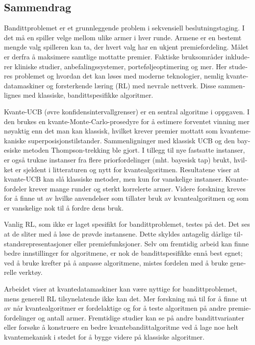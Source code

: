 \begin{otherlanguage}{norsk}

  \chapter{Sammendrag}
  Bandittproblemet er et grunnleggende problem i sekvensiell beslutningstaging.
  I det må en spiller velge mellom ulike armer i hver runde.
  Armene er en bestemt mengde valg spilleren kan ta, der hvert valg har en ukjent premiefordeling.
  Målet er derfra å maksimere samtlige mottatte premier.
  Faktiske bruksområder inkluderer kliniske studier, anbefalingssystemer, porteføljeoptimering og mer.
  Her studeres problemet og hvordan det kan løses med moderne teknologier, nemlig kvantedatamaskiner og forsterkende læring (RL) med nevrale nettverk.
  Disse sammenlignes med klassiske, bandittspesifikke algoritmer.

  Kvante-UCB (øvre konfidensintervallgrenser) er en sentral algoritme i oppgaven.
  I den brukes en kvante-Monte-Carlo-prosedyre for å estimere forventet vinning mer nøyaktig enn det man kan klassisk, hvilket krever premier mottatt som kvantemekaniske superposisjonstilstander.
  Sammenligninger med klassisk UCB og den bayesiske metoden Thompson-trekking ble gjort.
  I tillegg til nye fastsatte instanser, er også trukne instanser fra flere priorfordelinger (mht. bayesisk tap) brukt, hvilket er sjeldent i litteraturen og nytt for kvantealgoritmen.
  Resultatene viser at kvante-UCB kan slå klassiske metoder, men kun for vanskelige instanser.
  Kvantefordeler krever mange runder og sterkt korrelerte armer.
  Videre forskning kreves for å finne ut av hvilke anvendelser som tillater bruk av kvantealgoritmen og som er vanskelige nok til å fordre dens bruk.

  Vanlig RL, som ikke er laget spesifikt for bandittproblemet, testes på det.
  Det ses at de sliter med å løse de prøvde instansene.
  Dette skyldes antagelig dårlige tilstandsrepresentasjoner eller premiefunksjoner.
  Selv om fremtidig arbeid kan finne bedre innstillinger for algoritmene, er nok de bandittspesifikke ennå best egnet; ved å bruke krefter på å anpasse algoritmene, mistes fordelen med å bruke generelle verktøy.

  Arbeidet viser at kvantedatamaskiner kan være nyttige for bandittproblemet, mens generell RL tilsynelatende ikke kan det.
  Mer forskning må til for å finne ut av når kvantealgoritmer er fordelaktige og for å teste algoritmen på andre premiefordelinger og antall armer.
  Fremtidige studier kan se på andre bandittvarianter eller forsøke å konstruere en bedre kvantebandittalgoritme ved å lage noe helt kvantemekanisk i stedet for å bygge videre på klassiske algoritmer.

\end{otherlanguage}

\cleardoublepage